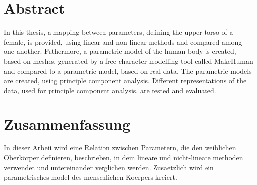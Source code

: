 \chapter*{Abstract}

In this thesis, a mapping between parameters, defining the upper torso of a female, is provided, using linear and non-linear methods and compared among one another. Futhermore, a parametric model of the human body is created, based on meshes, generated by a free character modelling tool called MakeHuman and compared to a parametric model, based on real data. The parametric models are created, using principle component analysis. Different representations of the data, used for principle component analysis, are tested and evaluated.

\cleardoublepage
\chapter*{Zusammenfassung}
In dieser Arbeit wird eine Relation zwischen Parametern, die den weiblichen Oberkörper definieren, beschrieben, in dem lineare und nicht-lineare methoden verwendet und untereinander verglichen werden. Zusaetzlich wird ein parametrisches model des menschlichen Koerpers kreiert.
